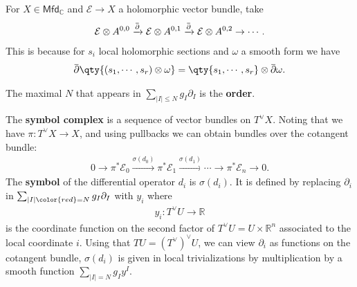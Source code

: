 \begin{example}[?]

For \(X\in {\mathsf{Mfd}}_{\mathbb{C}}\) and \(\mathcal{E} \to X\) a
holomorphic vector bundle, take
\begin{align*}
\mathcal{E} \otimes A^{0,0} \xrightarrow{\mkern 1.5mu\overline{\mkern-1.5mu{\partial}\mkern-1.5mu}\mkern 1.5mu} \mathcal{E} \otimes A^{0, 1} \xrightarrow{\mkern 1.5mu\overline{\mkern-1.5mu{\partial}\mkern-1.5mu}\mkern 1.5mu} \mathcal{E} \otimes A^{0, 2} \to \cdots
.\end{align*}
This is because for \(s_i\) local holomorphic sections and \(\omega\) a
smooth form we have
\begin{align*}
\mkern 1.5mu\overline{\mkern-1.5mu{\partial}\mkern-1.5mu}\mkern 1.5mu\qty{ (s_1, \cdots, s_r) \otimes\omega } = \qty{s_1, \cdots, s_r} \otimes\mkern 1.5mu\overline{\mkern-1.5mu{\partial}\mkern-1.5mu}\mkern 1.5mu\omega
.\end{align*}

\end{example}

\begin{definition}

The maximal \(N\) that appears in
\(\sum_{ {\left\lvert {I} \right\rvert} \leq N} g_I {{\partial}}_I\) is
the \textbf{order}.

\end{definition}

\begin{definition}

The \textbf{symbol complex} is a sequence of vector bundles on
\(T^\vee X\). Noting that we have \(\pi: T^\vee X\to X\), and using
pullbacks we can obtain bundles over the cotangent bundle:
\begin{align*}
0 \to \pi^* \mathcal{E}_0 \xrightarrow{\sigma(d_0)} \pi^* \mathcal{E}_1 \xrightarrow{\sigma(d_1)} \cdots \to \pi^* \mathcal{E}_n \to 0
.\end{align*}
The \textbf{symbol} of the differential operator \(d_i\) is
\(\sigma(d_i)\). It is defined by replacing \({\partial}_i\) in
\(\sum_{{\left\lvert {I} \right\rvert} {\color{red} =} N } g_I {\partial}_I\)
with \(y_i\) where
\begin{align*}
y_i: T^\vee U \to {\mathbb{R}}
\end{align*}
is the coordinate function on the second factor of
\(T^\vee U = U \times{\mathbb{R}}^n\) associated to the local coordinate
\(i\). Using that \(TU = (T^\vee)^\vee U\), we can view \({\partial}_i\)
as functions on the cotangent bundle, \(\sigma(d_i)\) is given in local
trivializations by multiplication by a smooth function
\(\sum_{{\left\lvert {I} \right\rvert} = N} g_I y^I\).

\end{definition}

